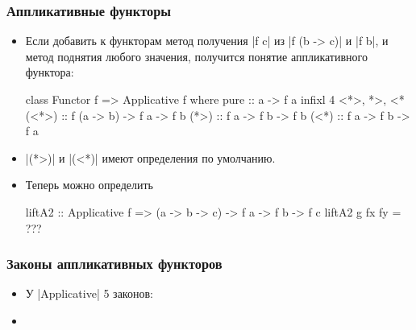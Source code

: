 \documentclass[11pt]{beamer}
\begin{document}
\begin{frame}[fragile]
  \frametitle{Аппликативные функторы}
  \begin{itemize}
    \item Если добавить к функторам метод получения \haskinline|f c| из \haskinline|f (b -> c)| и \haskinline|f b|, и метод поднятия любого значения, получится понятие аппликативного функтора:
          \begin{haskell}
            class Functor f => Applicative f where
              pure  :: a -> f a
              infixl 4 <*>, *>, <*
              (<*>) :: f (a -> b) -> f a -> f b
              (*>) :: f a -> f b -> f b
              (<*) :: f a -> f b -> f a
          \end{haskell}
    \item \haskinline|(*>)| и \haskinline|(<*)| имеют определения по умолчанию.
    \item Теперь можно определить
          \begin{haskell}
            liftA2 :: Applicative f => (a -> b -> c) -> 
              f a -> f b -> f c
            liftA2 g fx fy = ???
          \end{haskell}
  \end{itemize}
\end{frame}

\begin{frame}[fragile]
  \frametitle{Законы аппликативных функторов}
  \begin{itemize}
    \item У \haskinline|Applicative| 5 законов:
    \item
  \end{itemize}
\end{frame}
\end{document}
